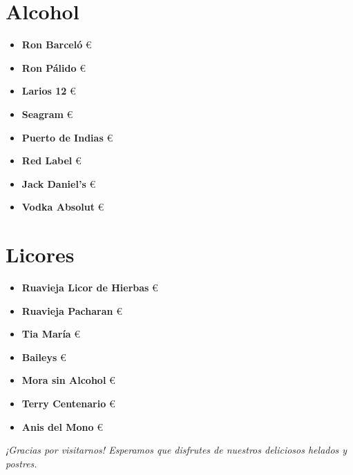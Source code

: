 \documentclass[a4paper,12pt]{article}
\begin{document}
\begin{multicols}{2}
\section*{ Alcohol}
\begin{itemize}
    \item \textbf{Ron Barceló}  €
    \item \textbf{Ron Pálido}  €
    \item \textbf{Larios 12}  €
    \item \textbf{Seagram}  €
    \item \textbf{Puerto de Indias}  €
    \item \textbf{Red Label}  €
    \item \textbf{Jack Daniel's}  €
    \item \textbf{Vodka Absolut}  €
\end{itemize}

\columnbreak

\section*{ Licores}
\begin{itemize}
    \item \textbf{Ruavieja Licor de Hierbas}  €
    \item \textbf{Ruavieja Pacharan}  €
    \item \textbf{Tia María}  €
    \item \textbf{Baileys}  €
    \item \textbf{Mora sin Alcohol}  €
    \item \textbf{Terry Centenario}  €
    \item \textbf{Anis del Mono}  €
\end{itemize}
\end{multicols}

\vfill
\begin{center}
    \textit{¡Gracias por visitarnos! Esperamos que disfrutes de nuestros deliciosos helados y postres.}
\end{center}
\end{document}
